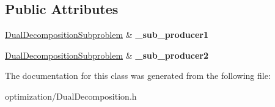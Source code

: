 \subsection*{Public Attributes}
\begin{DoxyCompactItemize}
\item 
\hypertarget{classDualDecompositionRunner_a13371fbf1e5109e8a9d920d2ed0b7bea}{
\hyperlink{classDualDecompositionSubproblem}{DualDecompositionSubproblem} \& {\bfseries \_\-sub\_\-producer1}}
\label{classDualDecompositionRunner_a13371fbf1e5109e8a9d920d2ed0b7bea}

\item 
\hypertarget{classDualDecompositionRunner_a988b68df84c131bc47d142ae8638fbd1}{
\hyperlink{classDualDecompositionSubproblem}{DualDecompositionSubproblem} \& {\bfseries \_\-sub\_\-producer2}}
\label{classDualDecompositionRunner_a988b68df84c131bc47d142ae8638fbd1}

\end{DoxyCompactItemize}


The documentation for this class was generated from the following file:\begin{DoxyCompactItemize}
\item 
optimization/DualDecomposition.h\end{DoxyCompactItemize}
